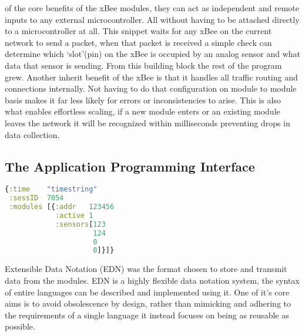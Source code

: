 

 of the core benefits of the xBee modules, they can act as independent and remote inputs to any external microcontroller. All without having to be attached directly to a microcontroller at all. This snippet waits for any xBee on the current network to send a packet, when that packet is received a simple check can determine which `slot'(pin) on the xBee is occupied by an analog sensor and what data that sensor is sending. From this building block the rest of the program grew.
Another inherit benefit of the xBee is that it handles all traffic routing and connections internally. Not having to do that configuration on module to module basis makes it far less likely for errors or inconsistencies to arise. This is also what enables effortless scaling, if a new module enters or an existing module leaves the network it will be recognized within milliseconds preventing drops in data collection.  

\FloatBarrier
\subsection{The Application Programming Interface}\label{subsec:api}


\begin{lstlisting}[language=clojure,frame=left]
{:time    "timestring"
 :sessID  7054
 :modules [{:addr   123456
            :active 1
            :sensors[123 
                     124 
                     0 
                     0]}]}
\end{lstlisting}

Extensible Data Notation (EDN) was the format chosen to store and transmit data from the modules. EDN is a highly flexible data notation system, the syntax of entire languages can be described and implemented using it. One of it's core aims is to avoid obsolescence by design, rather than mimicking and adhering to the requirements of a single language it instead focuses on being as reusable as possible.

